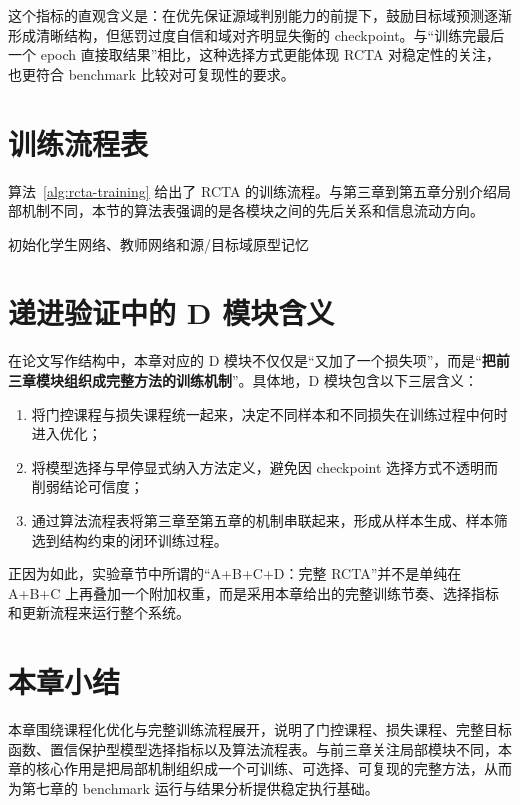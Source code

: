 这个指标的直观含义是：在优先保证源域判别能力的前提下，鼓励目标域预测逐渐形成清晰结构，但惩罚过度自信和域对齐明显失衡的 checkpoint。与“训练完最后一个 epoch 直接取结果”相比，这种选择方式更能体现 RCTA 对稳定性的关注，也更符合 benchmark 比较对可复现性的要求。

\section{训练流程表}
算法~\ref{alg:rcta-training} 给出了 RCTA 的训练流程。与第三章到第五章分别介绍局部机制不同，本节的算法表强调的是各模块之间的先后关系和信息流动方向。

\begin{algorithm}[htbp]
\caption{RCTA 训练流程}
\label{alg:rcta-training}
初始化学生网络、教师网络和源/目标域原型记忆\;
\end{algorithm}

\section{递进验证中的 D 模块含义}
在论文写作结构中，本章对应的 D 模块不仅仅是“又加了一个损失项”，而是“\textbf{把前三章模块组织成完整方法的训练机制}”。具体地，D 模块包含以下三层含义：

\begin{enumerate}
\item 将门控课程与损失课程统一起来，决定不同样本和不同损失在训练过程中何时进入优化；
\item 将模型选择与早停显式纳入方法定义，避免因 checkpoint 选择方式不透明而削弱结论可信度；
\item 通过算法流程表将第三章至第五章的机制串联起来，形成从样本生成、样本筛选到结构约束的闭环训练过程。
\end{enumerate}

正因为如此，实验章节中所谓的“A+B+C+D：完整 RCTA”并不是单纯在 A+B+C 上再叠加一个附加权重，而是采用本章给出的完整训练节奏、选择指标和更新流程来运行整个系统。

\section{本章小结}
本章围绕课程化优化与完整训练流程展开，说明了门控课程、损失课程、完整目标函数、置信保护型模型选择指标以及算法流程表。与前三章关注局部模块不同，本章的核心作用是把局部机制组织成一个可训练、可选择、可复现的完整方法，从而为第七章的 benchmark 运行与结果分析提供稳定执行基础。
